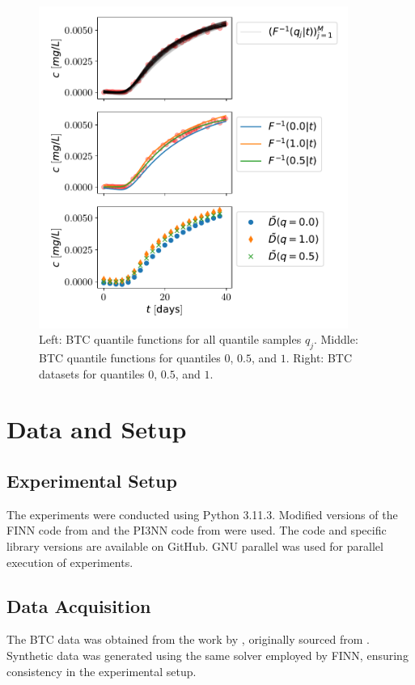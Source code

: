 \begin{figure}
    \centering
    \includegraphics[width=0.9\textwidth]{figs/btc_dataspan_quantiles.pdf}
    \caption{Left: BTC quantile functions for all quantile samples $q_j$. Middle: BTC quantile functions for quantiles $0$, $0.5$, and $1$. Right: BTC datasets for quantiles $0$, $0.5$, and $1$.}
    \label{fig:btc_dataspan_quantiles}
\end{figure}



\section{Data and Setup}

\subsection{Experimental Setup}
The experiments were conducted using Python 3.11.3. Modified versions of the FINN code from \cite{finn} and the PI3NN code from \cite{pi3nn} were used. The code and specific library versions are available on GitHub. GNU parallel \cite{tange_2023_10199085} was used for parallel execution of experiments. %

\subsection{Data Acquisition}
The BTC data was obtained from the work by \cite{finn}, originally sourced from \cite{nowak2016entropy}. Synthetic data was generated using the same solver employed by FINN, ensuring consistency in the experimental setup.

